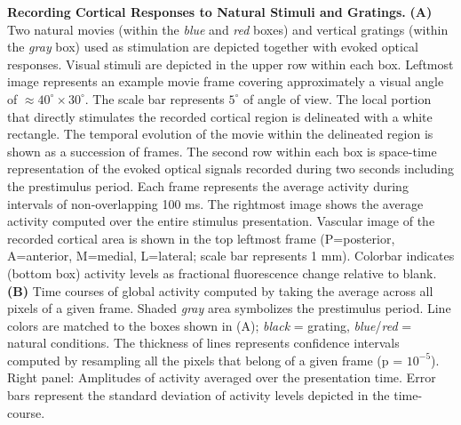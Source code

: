 \textbf{Recording Cortical Responses to Natural Stimuli and Gratings.}
\textbf{(A)} Two natural movies (within the \textit{blue} and \textit{red} boxes) and
vertical gratings (within the \textit{gray} box) used as stimulation are depicted
together with evoked optical responses. Visual stimuli are depicted in the
upper row within each box. Leftmost image represents an example movie frame
covering approximately a visual angle of $\approx
40^{\circ}\times30^{\circ}$. The scale bar represents $5^{\circ}$ of angle
of view. The local portion that directly stimulates the recorded cortical
region is delineated with a white rectangle. The temporal evolution of the
movie within the delineated region is shown as a succession of frames. The
second row within each box is space-time representation of the evoked
optical signals recorded during two seconds including the prestimulus
period. Each frame represents the average activity during intervals of
non-overlapping 100 ms. The rightmost image shows the average activity
computed over the entire stimulus presentation. Vascular image of the
recorded cortical area is shown in the top leftmost frame (P=posterior,
A=anterior, M=medial, L=lateral; scale bar represents 1 mm). Colorbar
indicates (bottom box) activity levels as fractional fluorescence change
relative to blank.  \textbf{(B)} Time courses of global activity computed
by taking the average across all pixels of a given frame. Shaded
\textit{gray} area symbolizes the prestimulus period. Line colors are
matched to the boxes shown in (A); \textit{black} = grating,
\textit{blue}/\textit{red} = natural conditions.  The thickness of lines
represents confidence intervals computed by resampling all the pixels that
belong of a given frame (p = $10^{-5}$).  Right panel: Amplitudes of
activity averaged over the presentation time.  Error bars represent the
standard deviation of activity levels depicted in the time-course.

